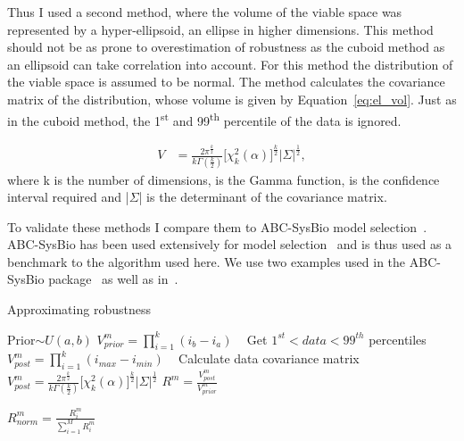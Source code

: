 Thus I used a second method, where the volume of the viable space was represented by a hyper-ellipsoid, an ellipse in higher dimensions. This method should not be as prone to overestimation of robustness as the cuboid method as an ellipsoid can take correlation into account. For this method the distribution of the viable space is assumed to be normal. The method calculates the covariance matrix of the distribution, whose volume is given by Equation~\ref{eq:el_vol}. Just as in the cuboid method, the 1\textsuperscript{st} and 99\textsuperscript{th} percentile of the data is ignored. 

\begin{align}
	V & = \frac{2\pi^{\frac{k}{2}}}{k\Gamma(\frac{k}{2})} \Big[ \chi _{k}^{2}(\alpha) \Big]^{\frac{k}{2}} |\Sigma|^\frac{1}{2}, \label{eq:el_vol}
\end{align}
\noindent where k is the number of dimensions, \textGamma{} is the Gamma function, \textalpha{} is the confidence interval required and |$\Sigma$| is the determinant of the covariance matrix. %

To validate these methods I compare them to ABC-SysBio model selection~\autocite{Liepe:2014iw}. ABC-SysBio has been used extensively for model selection~\autocite{Toni:2009tr, Toni:2011jy, Barnes:2011hh} and is thus used as a benchmark to the algorithm used here. We use two examples used in  the ABC-SysBio package~\autocite{Toni:2009tr} as well as in~\textcite{Toni:2010}. 


\begin{algorithm}[htbp]
\caption{Approximating robustness}
\label{alg:robustness}

 \begin{algorithmic}[1]
    \Statex
		\State Prior$\sim U(a, b)$
    	\State $V_{prior}^{m} = \prod_{i=1}^{k} (i_{b} - i_{a})$ \
		\Statex
			\State Get $1^{st} < data < 99^{th}$ percentiles
    		\State $V_{post}^{m} = \prod_{i=1}^{k} (i_{max} - i_{min})$ \
    		\EndIf
			\If{Ellipsoid calculation}
				\State Calculate data covariance matrix
    			\State $V_{post}^{m} = \frac{2\pi^{\frac{k}{2}}}{k\Gamma(\frac{k}{2})} \Big[ \chi _{k}^{2}(\alpha) \Big]^{\frac{k}{2}} |\Sigma|^\frac{1}{2}$
    		\EndIf
			\Statex
			\State $R^{m} = \frac{V_{post}^{m}}{V_{prior}^{m}}$
			
			\State $R_{norm}^{m} = \frac{R^{m}_i}{\sum_{i=1}^{M} R^m_i }$
		\EndFor
  \end{algorithmic}
\end{algorithm}	

